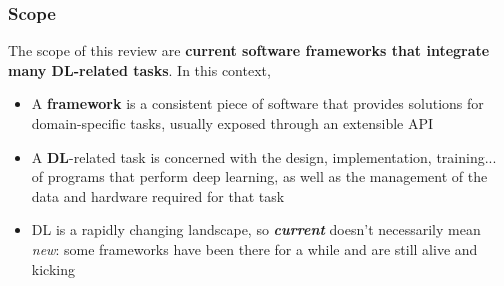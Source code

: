 \documentclass[hyperref={pdfpagelabels=false}]{beamer}
\begin{document}
     
     \begin{frame}
       \frametitle{Scope}
       The scope of this review are \textbf{current software frameworks that integrate many DL-related tasks}. In this context,

       \vspace{5mm}
       \begin{itemize}[<.->]
       \item \small{A \textbf{framework} is a consistent piece of software that provides solutions for domain-specific tasks, usually exposed through an extensible API}
       \item \small{A \textbf{DL}-related task is concerned with the design, implementation, training... of programs that perform deep learning, as well as the management of the data and hardware required for that task}
       \item \small{DL is a rapidly changing landscape, so \textbf{\textit{current}} doesn't necessarily mean \textit{new}: some frameworks have been there for a while and are still alive and kicking}
       \end{itemize}
     \end{frame}
\end{document}
